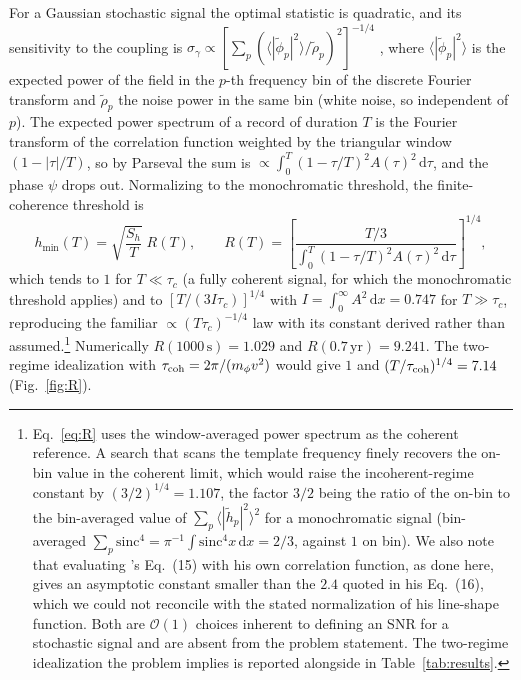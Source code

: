 For a Gaussian stochastic signal the optimal statistic is quadratic, and its sensitivity to the coupling is $\sigma_\gamma\propto\left[\sum_p\left(\langle|\tilde\phi_p|^2\rangle/\tilde\rho_p\right)^2\right]^{-1/4}$ \citep[Eq.~15]{Derevianko2018}, where $\langle|\tilde\phi_p|^2\rangle$ is the expected power of the field in the $p$-th frequency bin of the discrete Fourier transform and $\tilde\rho_p$ the noise power in the same bin (white noise, so independent of $p$). The expected power spectrum of a record of duration $T$ is the Fourier transform of the correlation function weighted by the triangular window $(1-|\tau|/T)$, so by Parseval the sum is $\propto\int_0^T(1-\tau/T)^2A(\tau)^2\,\mathrm{d}\tau$, and the phase $\psi$ drops out. Normalizing to the monochromatic threshold, the finite-coherence threshold is
\begin{equation}
h_{\min}(T)=\sqrt{\frac{S_h}{T}}\;R(T),\qquad
R(T)=\left[\frac{T/3}{\int_0^T(1-\tau/T)^2A(\tau)^2\,\mathrm{d}\tau}\right]^{1/4},
\label{eq:R}
\end{equation}
which tends to $1$ for $T\ll\tau_c$ (a fully coherent signal, for which the monochromatic threshold applies) and to $[T/(3I\tau_c)]^{1/4}$ with $I=\int_0^\infty A^2\,\mathrm{d}x=0.747$ for $T\gg\tau_c$, reproducing the familiar $\propto(T\tau_c)^{-1/4}$ law with its constant derived rather than assumed.\footnote{Eq.~\eqref{eq:R} uses the window-averaged power spectrum as the coherent reference. A search that scans the template frequency finely recovers the on-bin value in the coherent limit, which would raise the incoherent-regime constant by $(3/2)^{1/4}=1.107$, the factor $3/2$ being the ratio of the on-bin to the bin-averaged value of $\sum_p\langle|\tilde h_p|^2\rangle^2$ for a monochromatic signal (bin-averaged $\sum_p\mathrm{sinc}^4=\pi^{-1}\!\int\mathrm{sinc}^4x\,\mathrm{d}x=2/3$, against $1$ on bin). We also note that evaluating \citet{Derevianko2018}'s Eq.~(15) with his own correlation function, as done here, gives an asymptotic constant smaller than the $2.4$ quoted in his Eq.~(16), which we could not reconcile with the stated normalization of his line-shape function. Both are $\mathcal O(1)$ choices inherent to defining an SNR for a stochastic signal and are absent from the problem statement. The two-regime idealization the problem implies is reported alongside in Table~\ref{tab:results}.} Numerically $R(1000\,\mathrm{s})=1.029$ and $R(0.7\,\mathrm{yr})=9.241$. The two-regime idealization with $\tau_{\rm coh}=2\pi/(m_\phi v^2)$ would give $1$ and $(T/\tau_{\rm coh})^{1/4}=7.14$ (Fig.~\ref{fig:R}).

